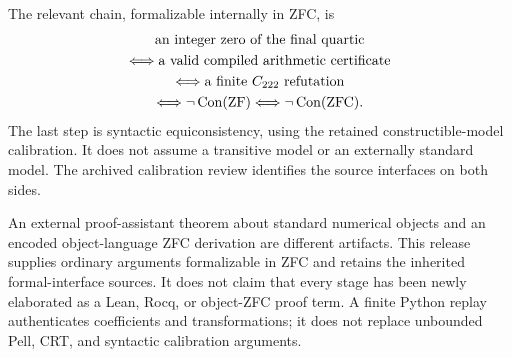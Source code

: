 The relevant chain, formalizable internally in ZFC, is
\[
 \begin{gathered}
  \text{an integer zero of the final quartic}\\
  \Longleftrightarrow\text{a valid compiled arithmetic certificate}\\
  \Longleftrightarrow\text{a finite }C_{222}\text{ refutation}\\
  \Longleftrightarrow\neg\operatorname{Con}(\mathrm{ZF})
  \Longleftrightarrow\neg\operatorname{Con}(\mathrm{ZFC}).
 \end{gathered}
\]
The last step is syntactic equiconsistency, using the retained
constructible-model calibration. It does not assume a transitive
model or an externally standard model. The archived calibration
review identifies the source interfaces on both sides.

An external proof-assistant theorem about standard numerical objects
and an encoded object-language ZFC derivation are different artifacts.
This release supplies ordinary arguments formalizable in ZFC and
retains the inherited formal-interface sources. It does not claim
that every stage has been newly elaborated as a Lean, Rocq, or
object-ZFC proof term. A finite Python replay authenticates coefficients
and transformations; it does not replace unbounded Pell, CRT, and
syntactic calibration arguments.

